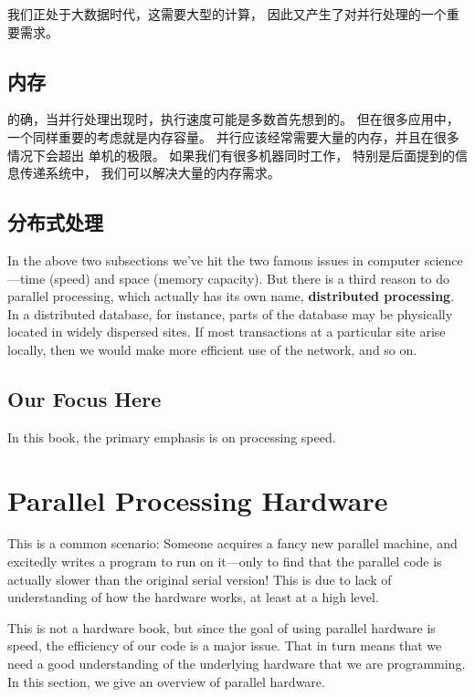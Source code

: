 我们正处于大数据时代，这需要大型的计算，
因此又产生了对并行处理的一个重要需求。


\subsection{内存}

的确，当并行处理出现时，执行速度可能是多数首先想到的。
但在很多应用中，一个同样重要的考虑就是内存容量。
并行应该经常需要大量的内存，并且在很多情况下会超出
单机的极限。
如果我们有很多机器同时工作，
特别是后面提到的信息传递系统中，
我们可以解决大量的内存需求。

\subsection{分布式处理}

In the above two subsections we've hit the two famous issues in computer
science---time (speed) and space (memory capacity).  But there is a
third reason to do parallel processing, which actually has its own name,
{\bf distributed processing}.  In a distributed database, for instance,
parts of the database may be physically located in widely dispersed
sites.  If most transactions at a particular site arise locally, then
we would make more efficient use of the network, and so on.

\subsection{Our Focus Here}

In this book, the primary emphasis is on processing speed.

\section{Parallel Processing Hardware}

This is a common scenario:  Someone acquires a fancy new parallel
machine, and excitedly writes a program to run on it---only to find that
the parallel code is actually slower than the original serial version!
This is due to lack of understanding of how the hardware works, at least
at a high level.

This is not a hardware book, but since the goal of using parallel
hardware is speed, the efficiency of our code is a major issue.  That in
turn means that we need a good understanding of the underlying hardware
that we are programming.  In this section, we give an overview of
parallel hardware.

